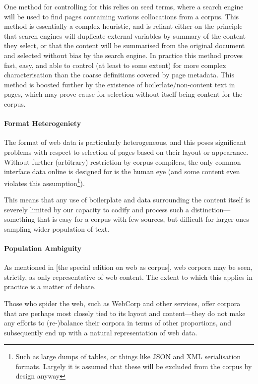 One method for controlling for this relies on seed terms, where a search engine will be used to find pages containing various collocations from a corpus.  This method is essentially a complex heuristic, and is reliant either on the principle that search engines will duplicate external variables by summary of the content they select, or that the content will be summarised from the original document and selected without bias by the search engine.  In practice this method proves fast, easy, and able to control (at least to some extent) for more complex characterisation than the coarse definitions covered by page metadata.  This method is boosted further by the existence of boilerlate/non-content text in pages, which may prove cause for selection without itself being content for the corpus.

\paragraph{Format Heterogeniety}
The format of web data is particularly heterogeneous, and this poses significant problems with respect to selection of pages based on their layout or appearance.  Without further (arbitrary) restriction by corpus compilers, the only common interface data online is designed for is the human eye (and some content even violates this assumption\footnote{Such as large dumps of tables, or things like JSON and XML serialisation formats.  Largely it is assumed that these will be excluded from the corpus by design anyway}).  

This means that any use of boilerplate and data surrounding the content itself is severely limited by our capacity to codify and process such a distinction---something that is easy for a corpus with few sources, but difficult for larger ones sampling wider population of text.

\paragraph{Population Ambiguity}
As mentioned in [the special edition on web as corpus], web corpora may be seen, strictly, as only representative of web content.  The extent to which this applies in practice is a matter of debate.

Those who spider the web, such as WebCorp and other services, offer corpora that are perhaps most closely tied to its layout and content---they do not make any efforts to (re-)balance their corpora in terms of other proportions, and subsequently end up with a natural representation of web data.

